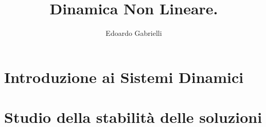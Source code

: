 
\author{Edoardo Gabrielli}
\title{Dinamica Non Lineare.}


\let\cleardoublepage\clearpage
\mygeo

\maketitle 
\tableofcontents

\restoregeometry

\chapter{Introduzione ai Sistemi Dinamici}










\chapter{Studio della stabilità delle soluzioni}









